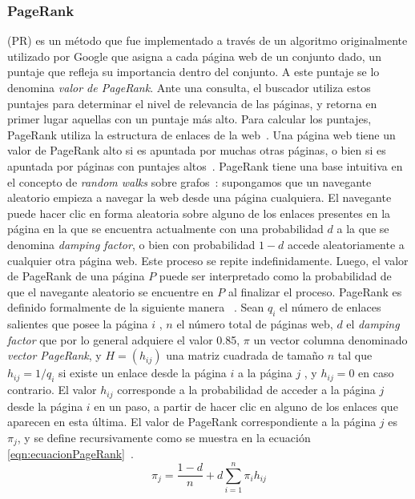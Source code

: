 \subsubsection{PageRank}
(PR) es un método que fue implementado a través de un algoritmo
originalmente utilizado por Google que asigna a cada página web de un conjunto dado, un puntaje que refleja su importancia dentro del conjunto. A este puntaje se lo denomina \textit{valor de PageRank}. Ante una consulta, el buscador utiliza estos puntajes para determinar el nivel de relevancia de las páginas, y retorna en primer lugar aquellas con un puntaje más alto. Para calcular los puntajes, PageRank utiliza la estructura de enlaces de la web~\cite{brin1998anatomy}. Una página web tiene un valor de PageRank alto si es apuntada por muchas otras páginas, o bien si es apuntada por páginas con puntajes altos~\cite{page1999pagerank}. PageRank tiene una base intuitiva en el concepto de \textit{random walks} sobre grafos~\cite{gobel1974random}: supongamos que un navegante aleatorio empieza a navegar la web desde una página cualquiera. El navegante puede hacer clic en forma aleatoria sobre alguno de los enlaces presentes en la página en la que se encuentra actualmente con una probabilidad $d$ a la que se denomina \textit{damping factor}, o bien con probabilidad $1-d$ accede aleatoriamente a cualquier otra página web. Este proceso se repite indefinidamente. Luego, el valor de PageRank de una página $P$ puede ser interpretado como la probabilidad de que el navegante aleatorio se encuentre en $P$ al finalizar el proceso. PageRank es definido formalmente de la siguiente manera ~\cite{franceschet2011pagerank}. Sean $q_i$ el número de enlaces salientes que posee la página $i$ , $n$ el número total de páginas web, $d$ el \textit{damping factor} que por lo general adquiere el valor 0.85, $\pi$ un vector columna denominado \textit{vector PageRank}, y $H = (h_{ij})$ una matriz cuadrada de tamaño $n$ tal que $h_{ij} = 1/q_i$ si existe un enlace desde la página $i$ a la página $j$ , y $h_{ij} = 0$ en caso contrario. El valor $h_{ij}$ corresponde a la probabilidad de acceder a la página $j$ desde la página $i$ en un paso, a partir de hacer clic en alguno de los enlaces que aparecen en esta última. El valor de PageRank correspondiente a la página $j$ es $\pi_j$, y se define recursivamente como se muestra en la ecuación \ref{eqn:ecuacionPageRank}~\cite{lin2010data}.
\vspace{-5pt}
\begin{equation} 
	\label{eqn:ecuacionPageRank} 
	\pi_j = \frac{1-d}{n} + d \sum_{i=1}^{n} \pi_i h_{ij} 
\end{equation}
\vspace{-20pt}
